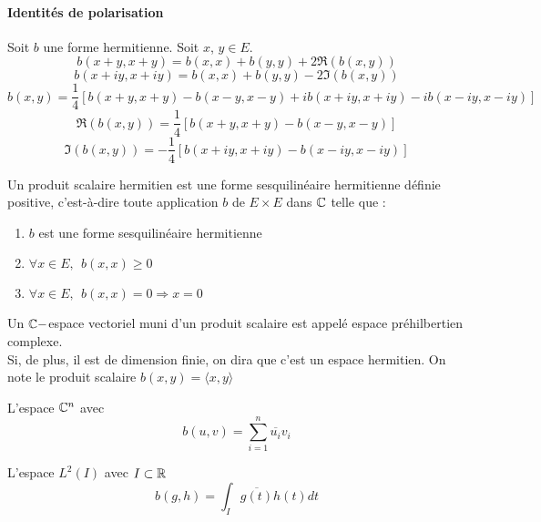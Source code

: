 \paragraph*{Identités de polarisation}
$ $\\
Soit $b$ une forme hermitienne. Soit $x$, $y \in E$.
\begin{equation}
b(x+y, x+y)=b(x,x)+b(y,y)+2\Re (b(x,y))
\end{equation}
\begin{equation}
b(x+iy,x+iy)=b(x,x)+b(y,y)-2\Im (b(x,y))
\end{equation}
\begin{equation}
b(x,y)=\frac{1}{4}[b(x+y,x+y)-b(x-y,x-y)+ib(x+iy,x+iy)-ib(x-iy,x-iy)]
\end{equation}
\begin{equation}
\Re (b(x,y))=\frac{1}{4} [b(x+y,x+y)-b(x-y,x-y)]
\end{equation}
\begin{equation}
\Im (b(x,y))=-\frac{1}{4} [b(x+iy,x+iy)-b(x-iy,x-iy)]
\end{equation}
\begin{definition}
	Un produit scalaire hermitien est une forme sesquilinéaire hermitienne définie positive, c’est-à-dire toute application $b$ de $E \times E$ dans $\mathbb C$ telle que :
	\begin{enumerate}
		\item $b$ est une forme sesquilinéaire hermitienne
		\item $\forall x \in E, \:\: b(x,x)\geq 0$
		\item $\forall x \in E, \:\: b(x,x)=0 \Rightarrow x=0$
	\end{enumerate}
\end{definition}
\begin{definition}
	Un $\mathbb C-$espace vectoriel muni d'un produit scalaire est appelé espace préhilbertien complexe.\\
	Si, de plus, il est de dimension finie, on dira que c’est un espace hermitien. On note le produit scalaire $b(x,y)=\langle x, y \rangle$
\end{definition}
\begin{ex}
	L'espace $\mathbb C^n$ avec
	\begin{equation*}
	b(u,v)=\sum_{i=1}^{n} \overline{u_i}v_i
	\end{equation*}
\end{ex}
\begin{ex}
	L'espace $L^2(I)$ avec $I \subset \mathbb R$
	\begin{equation*}
	b(g,h)=\int_{I} \overline{g(t)}h(t)dt
	\end{equation*}
\end{ex}
